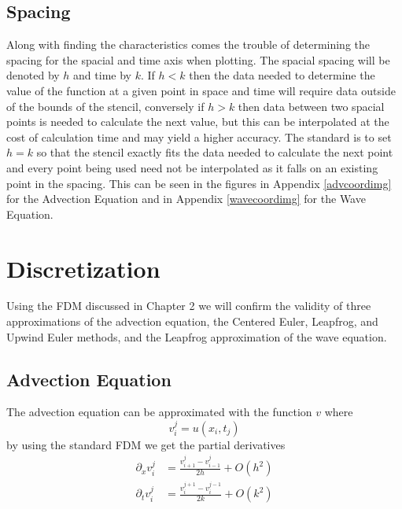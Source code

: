 \subsection{Spacing}
Along with finding the characteristics comes the trouble of determining the spacing for the spacial and time axis when plotting. The spacial spacing will be denoted by $h$ and time by $k$. If $h<k$ then the data needed to determine the value of the function at a given point in space and time will require data outside of the bounds of the stencil, conversely if $h>k$ then data between two spacial points is needed to calculate the next value, but this can be interpolated at the cost of calculation time and may yield a higher accuracy. The standard is to set $h=k$ so that the stencil exactly fits the data needed to calculate the next point and every point being used need not be interpolated as it falls on an existing point in the spacing. This can be seen in the figures in Appendix \ref{advcoordimg} for the Advection Equation and in Appendix \ref{wavecoordimg} for the Wave Equation.
\section{Discretization}
Using the FDM discussed in Chapter 2 we will confirm the validity of three approximations of the advection equation, the Centered Euler, Leapfrog, and Upwind Euler methods, and the Leapfrog approximation of the wave equation.
\subsection{Advection Equation}
The advection equation can be approximated with the function $v$ where
\begin{equation}
v_i^j = u(x_i,t_j)
\end{equation}
by using the standard FDM we get the partial derivatives
\begin{equation}\label{advfdm}
\begin{align}
    \partial_xv_i^j &= \frac{v_{i+1}^j - v_{i-1}^j}{2h} + O(h^2) \\
    \partial_tv_i^j &= \frac{v_i^{j+1} - v_i^{j-1}}{2k} + O(k^2)
\end{align}
\end{equation}
